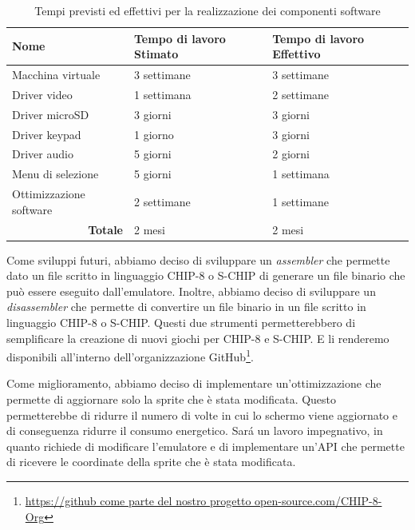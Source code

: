 \documentclass[a4paper]{article}
\begin{document}
\begin{center}
    \begin{table}[ht]
        \centering
        \begin{tabular}{|l|l|l|}
            \hline
            \textbf{Nome}                         & \textbf{Tempo di lavoro Stimato} & \textbf{Tempo di lavoro Effettivo} \\ \hline
            Macchina virtuale                     & 3 settimane                      & 3 settimane                      \\ \hline
            Driver video                          & 1 settimana                      & 2 settimane                      \\ \hline
            Driver microSD                        & 3 giorni                         & 3 giorni                         \\ \hline
            Driver keypad                         & 1 giorno                         & 3 giorni                         \\ \hline
            Driver audio                          & 5 giorni                         & 2 giorni                         \\ \hline
            Menu di selezione                     & 5 giorni                         & 1 settimana                      \\ \hline
            Ottimizzazione software               & 2 settimane                      & 1 settimane                      \\ \hline
            \multicolumn{1}{|r|}{\textbf{Totale}} & 2 mesi                           & 2 mesi                           \\ \hline
        \end{tabular}
        \caption{
            Tempi previsti ed effettivi per la realizzazione dei componenti software
        }
    \end{table}
\end{center}

Come sviluppi futuri, abbiamo deciso di sviluppare un \textit{assembler} che permette dato un file scritto in linguaggio CHIP-8 o S-CHIP di generare un file binario che può essere eseguito dall'emulatore. Inoltre, abbiamo deciso di sviluppare un \textit{disassembler} che permette di convertire un file binario in un file scritto in linguaggio CHIP-8 o S-CHIP. Questi due strumenti permetterebbero di semplificare la creazione di nuovi giochi per CHIP-8 e S-CHIP. E li renderemo disponibili all'interno dell'organizzazione GitHub\footnote{\url{https://github come parte del nostro progetto open-source.com/CHIP-8-Org}}.

Come miglioramento, abbiamo deciso di implementare un'ottimizzazione che permette di aggiornare solo la sprite che è stata modificata. Questo permetterebbe di ridurre il numero di volte in cui lo schermo viene aggiornato e di conseguenza ridurre il consumo energetico. Sar\'a un lavoro impegnativo, in quanto richiede di modificare l'emulatore e di implementare un'API che permette di ricevere le coordinate della sprite che è stata modificata.



\end{document}
